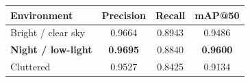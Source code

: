 \documentclass[border=10pt]{standalone}
\begin{document}
\begin{tabular}{lccc}
\toprule
\textbf{Environment} & \textbf{Precision} & \textbf{Recall} & \textbf{mAP@50} \\
\midrule
Bright / clear sky   & 0.9664 & 0.8943 & 0.9486 \\
\textbf{Night / low-light} & \textbf{0.9695} & 0.8840 & \textbf{0.9600} \\
Cluttered            & 0.9527 & 0.8425 & 0.9134 \\
\bottomrule
\end{tabular}
\end{document}
